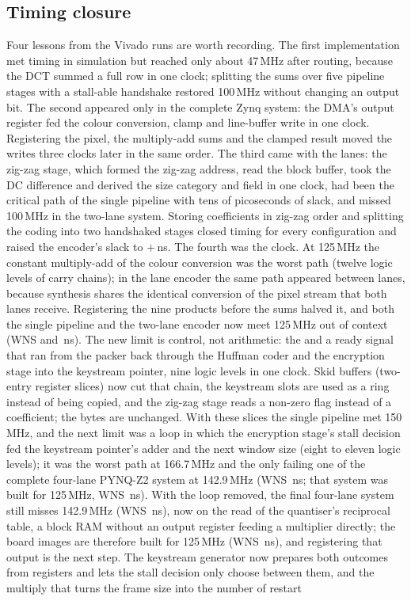 \subsection{Timing closure}\label{sec:timing}
Four lessons from the Vivado runs are worth recording. The first implementation met timing in simulation but reached only about 47\,MHz after routing, because the DCT summed a full row in one clock; splitting the sums over five pipeline stages with a stall-able handshake restored 100\,MHz without changing an output bit. The second appeared only in the complete Zynq system: the DMA's output register fed the colour conversion, clamp and line-buffer write in one clock. Registering the pixel, the multiply-add sums and the clamped result moved the writes three clocks later in the same order. The third came with the lanes: the zig-zag stage, which formed the zig-zag address, read the block buffer, took the DC difference and derived the size category and field in one clock, had been the critical path of the single pipeline with tens of picoseconds of slack, and missed 100\,MHz in the two-lane system. Storing coefficients in zig-zag order and splitting the coding into two handshaked stages closed timing for every configuration and raised the encoder's slack to $+$\TopWns\,ns. The fourth was the clock. At 125\,MHz the constant multiply-add of the colour conversion was the worst path (twelve logic levels of carry chains); in the lane encoder the same path appeared between lanes, because synthesis shares the identical conversion of the pixel stream that both lanes receive. Registering the nine products before the sums halved it, and both the single pipeline and the two-lane encoder now meet 125\,MHz out of context (WNS \TopWnsAtOneTwoFive{} and \LanesTwoWnsAtOneTwoFive\,ns). The new limit is control, not arithmetic: the \TopLimitAtOneTwoFive{} and a ready signal that ran from the packer back through the Huffman coder and the encryption stage into the keystream pointer, nine logic levels in one clock. Skid buffers (two-entry register slices) now cut that chain, the keystream slots are used as a ring instead of being copied, and the zig-zag stage reads a non-zero flag instead of a coefficient; the bytes are unchanged. With these slices the single pipeline met 150\,MHz, and the next limit was a loop in which the encryption stage's stall decision fed the keystream pointer's adder and the next window size (eight to eleven logic levels); it was the worst path at 166.7\,MHz and the only failing one of the complete four-lane PYNQ-Z2 system at 142.9\,MHz (WNS \OverlayLanesFourWnsAtOneFourTwo\,ns; that system was built for 125\,MHz, WNS \OverlayLanesFourWnsAtOneTwoFive\,ns). With the loop removed, the final four-lane system still misses 142.9\,MHz (WNS \OverlayLanesFourFinalWnsAtOneFourTwo\,ns), now on the read of the quantiser's reciprocal table, a block RAM without an output register feeding a multiplier directly; the board images are therefore built for 125\,MHz (WNS \OverlayLanesFourFinalWnsAtOneTwoFive\,ns), and registering that output is the next step. The keystream generator now prepares both outcomes from registers and lets the stall decision only choose between them, and the multiply that turns the frame size into the number of restart 